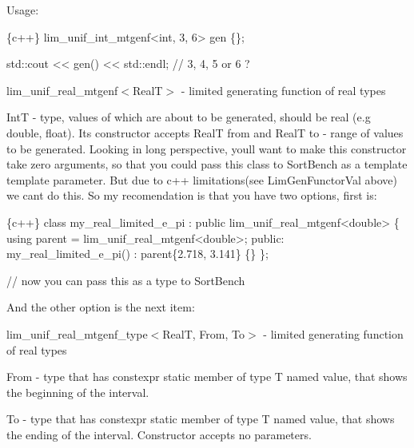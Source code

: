 Usage\+: 
\begin{DoxyCode}
\{c++\}
lim\_unif\_int\_mtgenf<int, 3, 6> gen \{\};

std::cout << gen() << std::endl; // 3, 4, 5 or 6 ?
\end{DoxyCode}



\begin{DoxyItemize}
\item {\ttfamily lim\+\_\+unif\+\_\+real\+\_\+mtgenf$<$RealT$>$} -\/ limited generating function of real types
\begin{DoxyItemize}
\item {\ttfamily IntT} -\/ type, values of which are about to be generated, should be real (e.\+g {\ttfamily double}, {\ttfamily float}). It\textquotesingle{}s constructor accepts {\ttfamily RealT from} and {\ttfamily RealT to} -\/ range of values to be generated. Looking in long perspective, you\textquotesingle{}ll want to make this constructor take zero arguments, so that you could pass this class to {\ttfamily Sort\+Bench} as a template template parameter. But due to c++ limitations(see {\ttfamily Lim\+Gen\+Functor\+Val} above) we can\textquotesingle{}t do this. So my recomendation is that you have two options, first is\+: 
\begin{DoxyCode}
\{c++\}
class my\_real\_limited\_e\_pi : public lim\_unif\_real\_mtgenf<double>
\{
    using parent = lim\_unif\_real\_mtgenf<double>;
public:
    my\_real\_limited\_e\_pi()
        : parent\{2.718, 3.141\} \{\}
\};

// now you can pass this as a type to SortBench
\end{DoxyCode}
 And the other option is the next item\+:
\end{DoxyItemize}
\item {\ttfamily lim\+\_\+unif\+\_\+real\+\_\+mtgenf\+\_\+type$<$RealT, From, To$>$} -\/ limited generating function of real types
\begin{DoxyItemize}
\item {\ttfamily From} -\/ type that has {\ttfamily constexpr static} member of type {\ttfamily T} named {\ttfamily value}, that shows the beginning of the interval.
\item {\ttfamily To} -\/ type that has {\ttfamily constexpr static} member of type {\ttfamily T} named {\ttfamily value}, that shows the ending of the interval. Constructor accepts no parameters.
\end{DoxyItemize}
\end{DoxyItemize}

